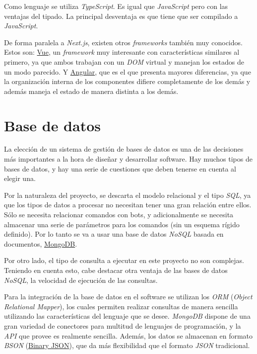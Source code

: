 Como lenguaje se utiliza \textit{TypeScript}. Es igual que \textit{JavaScript} pero con las ventajas del tipado. La principal desventaja es que tiene que ser compilado a \textit{JavaScript}.

De forma paralela a \textit{Next.js}, existen otros \textit{frameworks} también muy conocidos. Estos son: \href{https://vuejs.org/}{Vue}, un \textit{framework} muy interesante con características similares al primero, ya que ambos trabajan con un \textit{DOM} virtual y manejan los estados de un modo parecido. Y \href{https://angular.io/}{Angular}, que es el que presenta mayores diferencias, ya que la organización interna de los componentes difiere completamente de los demás y además maneja el estado de manera distinta a los demás.


\section{Base de datos}

La elección de un sistema de gestión de bases de datos es una de las decisiones más importantes a la hora de diseñar y desarrollar software. Hay muchos tipos de bases de datos, y hay una serie de cuestiones que deben tenerse en cuenta al elegir una.

Por la naturaleza del proyecto, se descarta el modelo relacional y el tipo \textit{SQL}, ya que los tipos de datos a procesar no necesitan tener una gran relación entre ellos. Sólo se necesita relacionar comandos con bots, y adicionalmente se necesita almacenar una serie de parámetros para los comandos (sin un esquema rígido definido). Por lo tanto se va a usar una base de datos \textit{NoSQL} basada en documentos, \href{https://www.mongodb.com/es}{MongoDB}.

Por otro lado, el tipo de consulta a ejecutar en este proyecto no son complejas. Teniendo en cuenta esto, cabe destacar otra ventaja de las bases de datos \textit{NoSQL}, la velocidad de ejecución de las consultas.

Para la integración de la base de datos en el software se utilizan los \textit{ORM} (\textit{Object Relational Mapper}), los cuales permiten realizar consultas de manera sencilla utilizando las características del lenguaje que se desee. \textit{MongoDB} dispone de una gran variedad de conectores para multitud de lenguajes de programación, y la \textit{API} que provee es realmente sencilla. Además, los datos se almacenan en formato \textit{BSON} (\href{https://www.mongodb.com/json-and-bson}{Binary JSON}), que da más flexibilidad que el formato \textit{JSON} tradicional.

